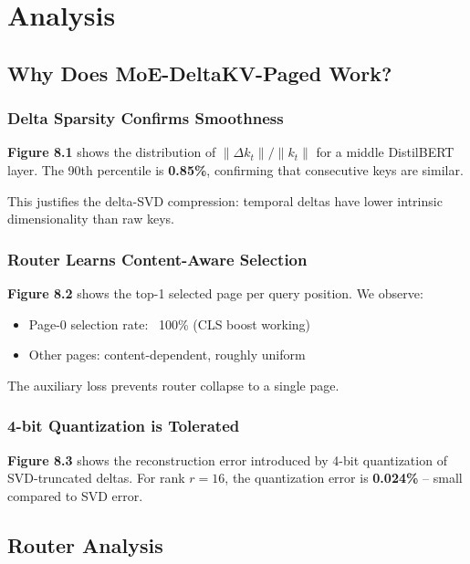 \section{Analysis}

\subsection{Why Does MoE-DeltaKV-Paged Work?}

\subsubsection{Delta Sparsity Confirms Smoothness}

\textbf{Figure 8.1} shows the distribution of $\|\Delta k_t\| / \|k_t\|$ for a 
middle DistilBERT layer. The 90th percentile is \textbf{0.85\%}, confirming 
that consecutive keys are similar.

This justifies the delta-SVD compression: temporal deltas have lower 
intrinsic dimensionality than raw keys.

\subsubsection{Router Learns Content-Aware Selection}

\textbf{Figure 8.2} shows the top-1 selected page per query position. We observe:

\begin{itemize}
\item Page-0 selection rate: ~100\% (CLS boost working)
\item Other pages: content-dependent, roughly uniform

\end{itemize}
The auxiliary loss prevents router collapse to a single page.

\subsubsection{4-bit Quantization is Tolerated}

\textbf{Figure 8.3} shows the reconstruction error introduced by 4-bit 
quantization of SVD-truncated deltas. For rank $r = 16$, the quantization 
error is \textbf{0.024\%} -- small compared to SVD error.

\subsection{Router Analysis}

